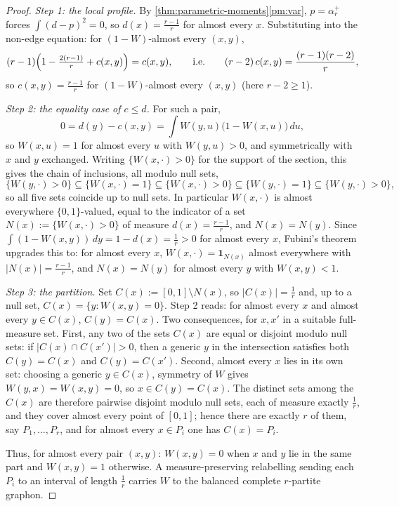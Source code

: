 \documentclass[11pt]{article}
\theoremstyle{definition}
\newcommand{\one}{\mathbf 1}
\begin{document}
\begin{proof}
\emph{Step 1: the local profile.}
By \cref{thm:parametric-moments}\ref{pm:var}, $p=\alpha_r^+$ forces
$\int(d-p)^2=0$, so $d(x)=\frac{r-1}r$ for almost every $x$.  Substituting into the
non-edge equation: for $(1-W)$-almost every $(x,y)$,
\[
  (r-1)\Bigl(1-\tfrac{2(r-1)}r+c(x,y)\Bigr)=c(x,y),
  \qquad\text{i.e.}\qquad
  (r-2)\,c(x,y)=\frac{(r-1)(r-2)}{r},
\]
so $c(x,y)=\frac{r-1}r$ for $(1-W)$-almost every $(x,y)$ (here $r-2\ge1$).

\emph{Step 2: the equality case of $c\le d$.}
For such a pair,
\[
  0=d(y)-c(x,y)=\int W(y,u)\bigl(1-W(x,u)\bigr)\,du,
\]
so $W(x,u)=1$ for almost every $u$ with $W(y,u)>0$, and symmetrically with $x$ and $y$
exchanged.  Writing $\{W(x,\cdot)>0\}$ for the support of the section, this gives the
chain of inclusions, all modulo null sets,
\[
  \{W(y,\cdot)>0\}\subseteq\{W(x,\cdot)=1\}\subseteq\{W(x,\cdot)>0\}
  \subseteq\{W(y,\cdot)=1\}\subseteq\{W(y,\cdot)>0\},
\]
so all five sets coincide up to null sets.  In particular $W(x,\cdot)$ is almost
everywhere $\{0,1\}$-valued, equal to the indicator of a set
$N(x):=\{W(x,\cdot)>0\}$ of measure $d(x)=\frac{r-1}r$, and $N(x)=N(y)$.  Since
$\int(1-W(x,y))\,dy=1-d(x)=\frac1r>0$ for almost every $x$, Fubini's theorem upgrades
this to: for almost every $x$, $W(x,\cdot)=\one_{N(x)}$ almost everywhere with
$|N(x)|=\frac{r-1}r$, and $N(x)=N(y)$ for almost every $y$ with $W(x,y)<1$.

\emph{Step 3: the partition.}
Set $C(x):=[0,1]\setminus N(x)$, so $|C(x)|=\frac1r$ and, up to a null set,
$C(x)=\{y:W(x,y)=0\}$.  Step 2 reads: for almost every $x$ and almost every
$y\in C(x)$, $C(y)=C(x)$.  Two consequences, for $x,x'$ in a suitable full-measure
set.  First, any two of the sets $C(x)$ are equal or disjoint modulo null sets: if
$|C(x)\cap C(x')|>0$, then a generic $y$ in the intersection satisfies both
$C(y)=C(x)$ and $C(y)=C(x')$.  Second, almost every $x$ lies in its own set: choosing
a generic $y\in C(x)$, symmetry of $W$ gives $W(y,x)=W(x,y)=0$, so
$x\in C(y)=C(x)$.  The distinct sets among the $C(x)$ are therefore pairwise disjoint
modulo null sets, each of measure exactly $\frac1r$, and they cover almost every point
of $[0,1]$; hence there are exactly $r$ of them, say $P_1,\dots,P_r$, and for almost
every $x\in P_i$ one has $C(x)=P_i$.

Thus, for almost every pair $(x,y)$: $W(x,y)=0$ when $x$ and $y$ lie in the same part
and $W(x,y)=1$ otherwise.  A measure-preserving relabelling sending each $P_i$ to an
interval of length $\frac1r$ carries $W$ to the balanced complete $r$-partite graphon.
\end{proof}
\end{document}
